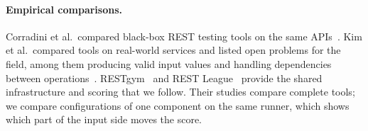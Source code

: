 \paragraph{Empirical comparisons.} Corradini et al.\ compared black-box
REST testing tools on the same APIs~\cite{corradini-comparison}. Kim et
al.\ compared tools on real-world services and listed open problems for the
field, among them producing valid input values and handling dependencies
between operations~\cite{no-time-to-rest}. RESTgym~\cite{restgym} and REST
League~\cite{restleague} provide the shared infrastructure and scoring that
we follow. Their studies compare complete tools; we compare configurations of
one component on the same runner, which shows which part of the input side
moves the score.
